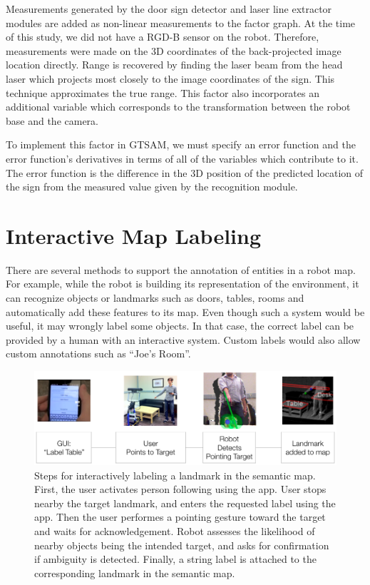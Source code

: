 \documentclass[3p]{elsarticle}
\begin{document}
Measurements generated by the door sign detector and laser line extractor modules are added as non-linear measurements to the factor graph. At the time of this study, we did not have a RGD-B sensor on the robot. Therefore, measurements were made on the 3D coordinates of the back-projected image location directly. Range is recovered by finding the laser beam from the head laser which
projects most closely to the image coordinates of the sign. This technique approximates the true range. This factor also incorporates an additional variable which corresponds
to the transformation between the robot base and the camera. 

To implement this factor in GTSAM, we must specify an error function and the
error function’s derivatives in terms of all of the variables which contribute to it. The
error function is the difference in the 3D position of the predicted location of the sign
from the measured value given by the recognition module. 

\section{Interactive Map Labeling}
\label{sec:interactive_map_labeling}

There are several methods to support the annotation of entities in a robot map. For example, while the robot is building its representation of the environment, it can recognize objects or landmarks such as doors, tables, rooms and automatically add these features to its map. Even though such a system would be useful, it may wrongly label some objects. In that case, the correct label can be provided by a human with an interactive system. Custom labels would also allow custom annotations such as ``Joe's Room''.


\begin{figure}[ht!]
\begin{center}
\centering
\includegraphics[width=\textwidth]{pics/labeling_flow}
\caption{Steps for interactively labeling a landmark in the semantic map. First, the user activates person following using the app. User 
stops nearby the target landmark, and enters the requested label using the app. Then the user performes a pointing gesture toward the target and waits for acknowledgement. Robot assesses the likelihood of nearby objects being the intended target, and asks for confirmation if ambiguity is detected. Finally, a string label is attached to the corresponding landmark in the semantic map.} 
\label{fig:labeling_flow}
\end{center}
\end{figure}
\end{document}
